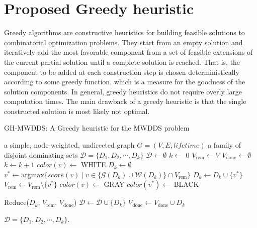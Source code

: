 \documentclass[algorithms,article,accept,moreauthors,pdftex]{Definitions/mdpi}
\begin{document}
\section{Proposed Greedy heuristic}
\label{sec:greedy}

Greedy algorithms are constructive heuristics for building feasible solutions to combinatorial optimization problems. They start from an empty solution and iteratively add the most favorable component from a set of feasible extensions of the current partial solution until a complete solution is reached. That is, the component to be added at each construction step is chosen deterministically according to some greedy function, which is a measure for the goodness of the solution components. In general, greedy heuristics do not require overly large computation times. The main drawback of a greedy heuristic is that the single constructed solution is most likely not optimal.

 \begin{algorithm}[t]
 \caption{GH-MWDDS: A Greedy heuristic for the MWDDS problem}
  \label{alg:1}
   \begin{normalsize}
   
 \begin{algorithmic}[1]
 \renewcommand{\algorithmicrequire}{\textbf{Input:}}
 \renewcommand{\algorithmicensure}{\textbf{Output:}}
 \REQUIRE a simple, node-weighted, undirected graph $G=(V,E, lifetime)$ 
 \ENSURE  a family of disjoint dominating sets $\mathcal{D} = \{D_{1}, D_{2},\cdots, D_{k} \}$
  \STATE $\mathcal{D}\gets  \emptyset$
  \STATE $k \gets$ 0
  \STATE $V_{\mathrm{rem}} \gets V$
  \STATE $V_{\mathrm{done}} \gets \emptyset$
        \STATE $k \gets k + 1$
              \STATE $ color(v) \gets $ WHITE
        \ENDFOR   
        \STATE $D_k  \gets \emptyset$ 
               \STATE $v^{*} \gets \text{argmax} \{ score(v) \mid  v \in \{\mathcal{G}(D_k) \cup \mathcal{W}(D_k)\} \cap V_{\mathrm{rem}} \}$                              
               \STATE $D_k \gets D_k \cup \{ v^{*} \}$
               \STATE $V_{\mathrm{rem}} \gets  V_{\mathrm{rem}} \setminus  \{ v^{*} \}$
                     \STATE $ color(v) \gets $ GRAY
                 \ENDIF
               \ENDFOR 
                \STATE $ color(v^{*}) \gets $ BLACK
                       
        \ENDWHILE
        \STATE \textsf{Reduce}($D_k$, $V_{\mathrm{rem}}$, $V_{\mathrm{done}}$) 
        \STATE $\mathcal{D}\gets  \mathcal{D} \cup  \{ D_k \}$
        \STATE $V_{\mathrm{done}} \gets V_{\mathrm{done}} \cup D_k$
   \ENDWHILE         
        
  \RETURN  $\mathcal{D} = \{D_{1}, D_{2},\cdots, D_{k} \}$.      			
  \end{algorithmic} 
  \end{normalsize}
\end{algorithm}
\end{document}

